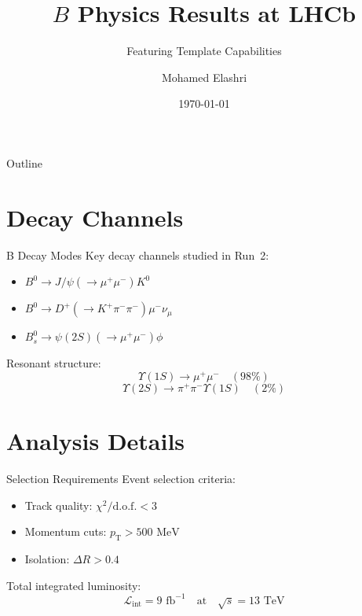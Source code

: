 \documentclass{me_beamer}
\title{$B$ Physics Results at LHCb}
\subtitle{Featuring Template Capabilities}
\author{Mohamed Elashri}
\institute{University of Cincinnati \and LHCb Collaboration}
\date{\today}
\begin{document}
\begin{frame}[plain]
    \titlepage
\end{frame}

\begin{frame}{Outline}
    \tableofcontents
\end{frame}

\section{Decay Channels}

\begin{frame}{B Decay Modes}
    Key decay channels studied in Run~2:
    \begin{itemize}
        \item $B^0 \to J/\psi(\to \mu^+\mu^-) K^0$
        \item $B^0 \to D^+(\to K^+\pi^-\pi^-)\mu^-\nu_\mu$
        \item $B^0_s \to \psi(2S)(\to \mu^+\mu^-)\phi$
    \end{itemize}
    
    Resonant structure:
    \[
        \Upsilon(1S) \to \mu^+\mu^- \quad (98\%)
    \]
    \[
        \Upsilon(2S) \to \pi^+\pi^-\Upsilon(1S) \quad (2\%)
    \]
\end{frame}

\section{Analysis Details}

\begin{frame}{Selection Requirements}
    Event selection criteria:
    \begin{itemize}
        \item Track quality: $\chi^2/\text{d.o.f.} < 3$
        \item Momentum cuts: $p_{\text{T}} > 500\text{ MeV}$
        \item Isolation: $\Delta R > 0.4$
    \end{itemize}
    
    \vspace{0.3cm}
    Total integrated luminosity:
    \[
        \mathcal{L}_{\text{int}} = 9\text{ fb}^{-1} \quad \text{at} \quad \sqrt{s} = 13\text{ TeV}
    \]
\end{frame}
\end{document}
